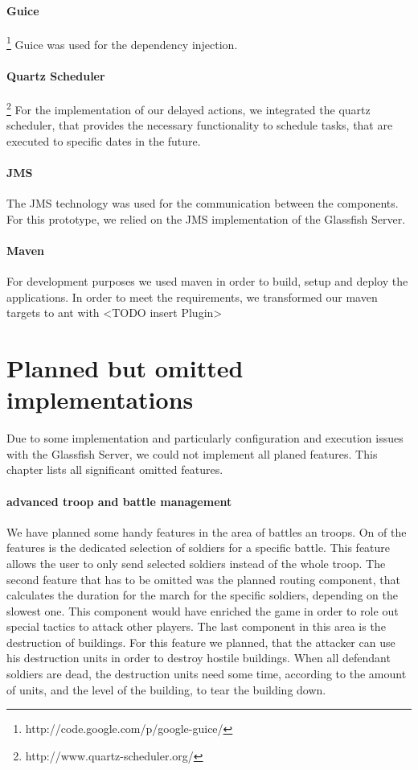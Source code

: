 \documentclass[a4paper]{article}
\begin{document}
\paragraph{Guice}\footnote{http://code.google.com/p/google-guice/}
Guice was used for the dependency injection.

\paragraph{Quartz Scheduler} \footnote{http://www.quartz-scheduler.org/}
For the implementation of our delayed actions, we integrated the quartz scheduler, that provides the necessary functionality to schedule tasks, that are executed to specific dates in the future.

\paragraph{JMS}
The JMS technology was used for the communication between the components. For this prototype, we relied on the JMS implementation of the Glassfish Server.

\paragraph{Maven}
For development purposes we used maven in order to build, setup and deploy the applications. In order to meet the requirements, we transformed our maven targets to ant with <TODO insert Plugin>




\section{Planned but omitted implementations}
Due to some implementation and particularly configuration and execution issues with the Glassfish Server, we could not implement all planed features. This chapter lists all significant omitted features.

\paragraph{advanced troop and battle management}
We have planned some handy features in the area of battles an troops. On of the features is the dedicated selection of soldiers for a specific battle. This feature  allows the user to only send selected soldiers instead of the whole troop. The second feature that has to be omitted was the planned routing component, that calculates the duration for the march for the specific soldiers, depending on the slowest one. This component would have enriched the game in order to role out special tactics to attack other players. The last component in this area is the destruction of buildings. For this feature we planned, that the attacker can use his destruction units in order to destroy hostile buildings. When all defendant soldiers are dead, the destruction units need some time, according to the amount of units, and the level of the building, to tear the building down.
\end{document}
